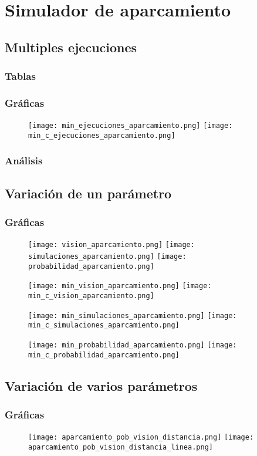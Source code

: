 \chapter{Simulador de aparcamiento}
\section{Multiples ejecuciones}
\subsection{Tablas}

\subsection{Gráficas}


\begin{figure}[h]
\texttt{[image: min\_ejecuciones\_aparcamiento.png]}
\texttt{[image: min\_c\_ejecuciones\_aparcamiento.png]}
\centering
\end{figure}


\subsection{Análisis}

\section{Variación de un parámetro}
\subsection{Gráficas}

\begin{figure}[h]
\texttt{[image: vision\_aparcamiento.png]}
\texttt{[image: simulaciones\_aparcamiento.png]}
\texttt{[image: probabilidad\_aparcamiento.png]}
\centering
\end{figure}


\begin{figure}[h]
\texttt{[image: min\_vision\_aparcamiento.png]}
\texttt{[image: min\_c\_vision\_aparcamiento.png]}
\centering
\end{figure}
\begin{figure}[h]
\texttt{[image: min\_simulaciones\_aparcamiento.png]}
\texttt{[image: min\_c\_simulaciones\_aparcamiento.png]}
\centering
\end{figure}
\begin{figure}[h]
\texttt{[image: min\_probabilidad\_aparcamiento.png]}
\texttt{[image: min\_c\_probabilidad\_aparcamiento.png]}
\centering
\end{figure}

\section{Variación de varios parámetros}
\subsection{Gráficas}
\begin{figure}[h]
\texttt{[image: aparcamiento\_pob\_vision\_distancia.png]}
\texttt{[image: aparcamiento\_pob\_vision\_distancia\_linea.png]}
\centering
\end{figure}
